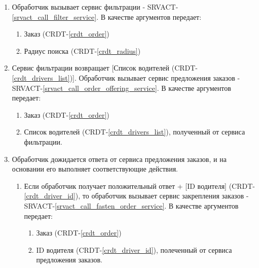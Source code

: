         \begin{alg} \label{alg_urgent_order_processing} \mbox{}

            \begin{enumerate}

               	\item Обработчик вызывает сервис фильтрации - SRVACT-\ref{srvact_call_filter_service}. В качестве аргументов передает:

               		\begin{enumerate}
               			\item Заказ (CRDT-\ref{crdt_order})
               			\item Радиус поиска (CRDT-\ref{crdt_radius})
               		\end{enumerate}

                \item Сервис фильтрации возвращает [Список водителей (CRDT-\ref{crdt_drivers_list})]. Обработчик вызывает сервис предложения заказов - SRVACT-\ref{srvact_call_order_offering_service}. В качестве аргументов передает:

               		\begin{enumerate}
               			\item Заказ (CRDT-\ref{crdt_order})
               			\item Список водителей (CRDT-\ref{crdt_drivers_list}), полученный от сервиса фильтрации.
               		\end{enumerate}
              
                \item Обработчик дожидается ответа от сервиса предложения заказов, и на основании его выполняет соответствующие действия.
                
                	\begin{enumerate}
               			\item Если обработчик получает положительный ответ + [ID водителя] (CRDT-\ref{crdt_driver_id}), то обработчик вызывает сервис закрепления заказов - SRVACT-\ref{srvact_call_fasten_order_service}. В качестве аргументов передает: 

	               			\begin{enumerate}
		               			\item Заказ (CRDT-\ref{crdt_order})
	         					\item ID водителя (CRDT-\ref{crdt_driver_id}), полеченный от сервиса предложения заказов.
		               		\end{enumerate}


\end{enumerate}
\end{enumerate}
\end{alg}
